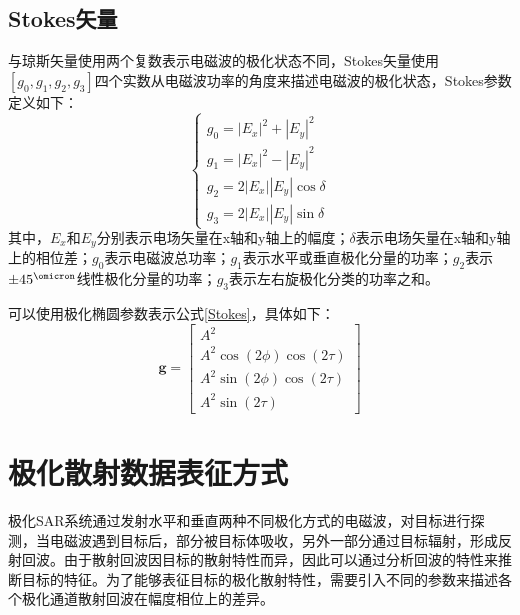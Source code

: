 \subsection{Stokes矢量}
与琼斯矢量使用两个复数表示电磁波的极化状态不同，Stokes矢量使用$[g_0,g_1,g_2,g_3]$四个实数从电磁波功率的角度来描述电磁波的极化状态，Stokes参数定义如下：
\begin{equation}
    \label{Stokes}
    \left\{\begin{array}{l}
        g_0=\left|E_x\right|^2+\left|E_y\right|^2         \\
        g_1=\left|E_x\right|^2-\left|E_y\right|^2         \\
        g_2=2\left|E_x\right|\left|E_y\right| \cos \delta \\
        g_3=2\left|E_x\right|\left|E_y\right| \sin \delta
    \end{array}\right.
\end{equation}
其中，$E_x$和$E_y$分别表示电场矢量在x轴和y轴上的幅度；$\delta$表示电场矢量在x轴和y轴上的相位差；$g_0$表示电磁波总功率；$g_1$表示水平或垂直极化分量的功率；$g_2$表示$\pm 45^{\operatorname{\omicron}}$线性极化分量的功率；$g_3$表示左右旋极化分类的功率之和。

可以使用极化椭圆参数表示公式\ref{Stokes}，具体如下：
\begin{equation}
    \boldsymbol{g}=\left[\begin{array}{c}
            A^2                             \\
            A^2 \cos (2 \phi) \cos (2 \tau) \\
            A^2 \sin (2 \phi) \cos (2 \tau) \\
            A^2 \sin (2 \tau)
        \end{array}\right]
\end{equation}

\section{极化散射数据表征方式}
极化SAR系统通过发射水平和垂直两种不同极化方式的电磁波，对目标进行探测，当电磁波遇到目标后，部分被目标体吸收，另外一部分通过目标辐射，形成反射回波。由于散射回波因目标的散射特性而异，因此可以通过分析回波的特性来推断目标的特征。为了能够表征目标的极化散射特性，需要引入不同的参数来描述各个极化通道散射回波在幅度相位上的差异。
